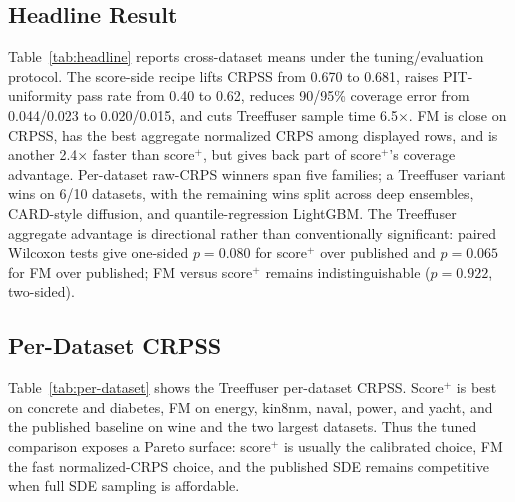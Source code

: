\documentclass{tpm2026}
\begin{document}
\subsection{Headline Result}\label{sec:headline}
Table~\ref{tab:headline} reports cross-dataset means under the tuning/evaluation protocol. The score-side recipe lifts CRPSS from 0.670 to 0.681, raises PIT-uniformity pass rate from 0.40 to 0.62, reduces 90/95\% coverage error from 0.044/0.023 to 0.020/0.015, and cuts Treeffuser sample time 6.5$\times$. FM is close on CRPSS, has the best aggregate normalized CRPS among displayed rows, and is another 2.4$\times$ faster than score$^+$, but gives back part of score$^+$'s coverage advantage. Per-dataset raw-CRPS winners span five families; a Treeffuser variant wins on 6/10 datasets, with the remaining wins split across deep ensembles, CARD-style diffusion, and quantile-regression LightGBM. The Treeffuser aggregate advantage is directional rather than conventionally significant: paired Wilcoxon tests give one-sided $p=0.080$ for score$^+$ over published and $p=0.065$ for FM over published; FM versus score$^+$ remains indistinguishable ($p=0.922$, two-sided).

\subsection{Per-Dataset CRPSS}\label{sec:perdata}
Table~\ref{tab:per-dataset} shows the Treeffuser per-dataset CRPSS. Score$^+$ is best on concrete and diabetes, FM on energy, kin8nm, naval, power, and yacht, and the published baseline on wine and the two largest datasets. Thus the tuned comparison exposes a Pareto surface: score$^+$ is usually the calibrated choice, FM the fast normalized-CRPS choice, and the published SDE remains competitive when full SDE sampling is affordable.
\end{document}
